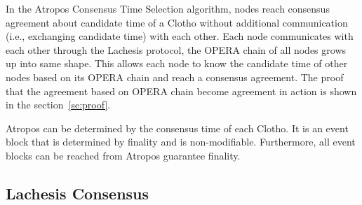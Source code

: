 \documentclass{article}
\begin{document}
In the Atropos Consensus Time Selection algorithm, nodes reach consensus agreement about candidate time of a Clotho without additional communication (i.e., exchanging candidate time) with each other. Each node communicates with each other through the Lachesis protocol, the OPERA chain of all nodes grows up into same shape. This allows each node to know the candidate time of other nodes based on its OPERA chain and reach a consensus agreement. The proof that the agreement based on OPERA chain become agreement in action is shown in the section~\ref{se:proof}.

Atropos can be determined by the consensus time of each Clotho. It is an event block that is determined by finality and is non-modifiable. Furthermore, all event blocks can be reached from Atropos guarantee finality.

\subsection{Lachesis Consensus}
\end{document}
